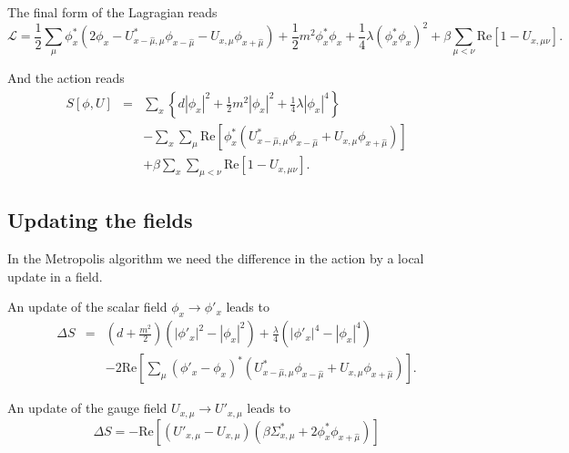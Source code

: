 \documentclass[12pt,a4paper]{article}
\begin{document}
The final form of the Lagragian reads
\begin{equation}
    \mathcal{L} = \frac{1}{2}\sum_{\mu}\phi_x^*\left( 2\phi_x - U^*_{x-\hat{\mu},\mu}\phi_{x-\hat{\mu}} - U_{x,\mu}\phi_{x+\hat{\mu}}\right) + \frac{1}{2}m^2\phi_x^*\phi_x + \frac{1}{4}\lambda\left(\phi_x^*\phi_x\right)^2 + \beta\sum_{\mu<\nu}\text{Re} \left[1 - U_{x,\mu\nu} \right].
\end{equation}

And the action reads
\begin{eqnarray}
    S[\phi,U] & = &\sum_x \left\{ d|\phi_x|^2 + \frac{1}{2}m^2|\phi_x|^2 + \frac{1}{4}\lambda |\phi_x|^4 \right\} \nonumber\\
    & & - \sum_x\sum_{\mu}\text{Re}\left[\phi_x^*\left(U^*_{x-\hat{\mu},\mu}\phi_{x-\hat{\mu}} + U_{x,\mu}\phi_{x+\hat{\mu}}\right)\right]\nonumber \\     
     & & + \beta\sum_x\sum_{\mu<\nu}\text{Re} \left[1 - U_{x,\mu\nu} \right].
\end{eqnarray}

\subsection{Updating the fields}
In the Metropolis algorithm we need the difference in the action by a local update in a field.

An update of the scalar field $\phi_x \to \phi'_x$ leads to 
\begin{eqnarray}
    \Delta S & = & \left(d +\frac{m^2}{2} \right)\left( |\phi'_x|^2 - |\phi_x|^2\right) + \frac{\lambda}{4}\left( |\phi'_x|^4 - |\phi_x|^4\right) \nonumber\\
    & &- 2\text{Re}\left[\sum_{\mu}\left(\phi'_x -\phi_x \right)^*\left(U^*_{x-\hat{\mu},\mu}\phi_{x-\hat{\mu}} + U_{x,\mu}\phi_{x+\hat{\mu}}\right) \right].
\end{eqnarray}

An update of the gauge field $U_{x,\mu} \to U'_{x,\mu}$ leads to
\begin{equation}
    \Delta S = -\text{Re} \left[ (U'_{x,\mu} - U_{x,\mu})\left(\beta\Sigma^*_{x,\mu}+2\phi^*_x \phi_{x+\hat{\mu}}\right)\right]
\end{equation}
\end{document}
